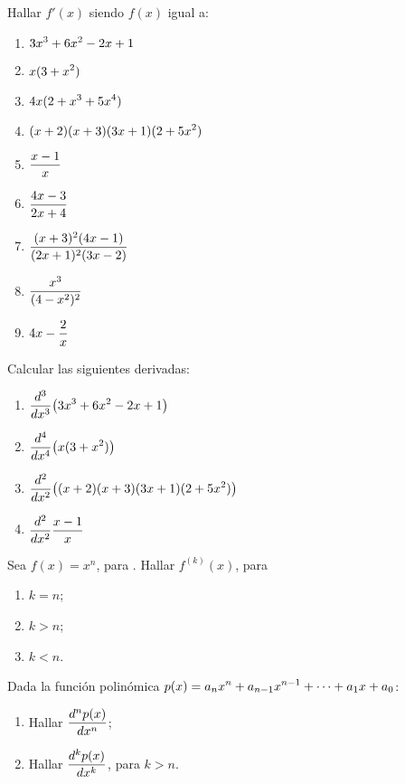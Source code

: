 \item Hallar $f'(x)$ siendo $f(x)$ igual a:
\begin{multicols}{2}
\begin{enumerate}
    \item $\D 3x^3+6x^2-2x+1$
    \item $\D x(3+x^2)$
    \item $\D 4x(2+x^3+5x^4)$
    \item $\D (x+2)(x+3)(3x+1)(2+5x^2)$
    \item $\D \frac{x-1}x$
    \item $\D \frac{4x-3}{2x+4}$
    \item $\D \frac{(x+3)^2(4x-1)}{(2x+1)^2(3x-2)}$
    \item $\D \frac{x^3}{(4-x^2)^2}$
    \item $\D 4x-\frac2x$
\end{enumerate}
\end{multicols}

\item Calcular las siguientes derivadas:
\begin{multicols}{2}
\begin{enumerate}
    \item $\D \dd[3]{}{x} \big(3x^3+6x^2-2x+1\big)$
    \item $\D \dd[4]{}{x}\big(x(3+x^2)\big)$
    \item $\D \dd[2]{}{x}\big((x+2)(x+3)(3x+1)(2+5x^2)\big)$
    \item $\D \dd[2]{}{x}\frac{x-1}x$
\end{enumerate}
\end{multicols}

\item Sea $f(x)=x^n$, para \niN. Hallar $f^{(k)}(x)$, para
\begin{multicols}{3}
    \begin{enumerate}
    \item $k=n$;
    \item $k>n$;
    \item $k<n$.
\end{enumerate}
\end{multicols}

\item Dada la función polinómica $\D p(x)=a_n x^n + a_{n-1} x^{n-1} + \dots + a_1 x + a_0$:
\begin{multicols}{2}
    \begin{enumerate}
    \item Hallar $\D \dd[n]{p(x)}{x}$;
    \item Hallar $\D \dd[k]{p(x)}{x}$, para $k>n$.
\end{enumerate}
\end{multicols}

